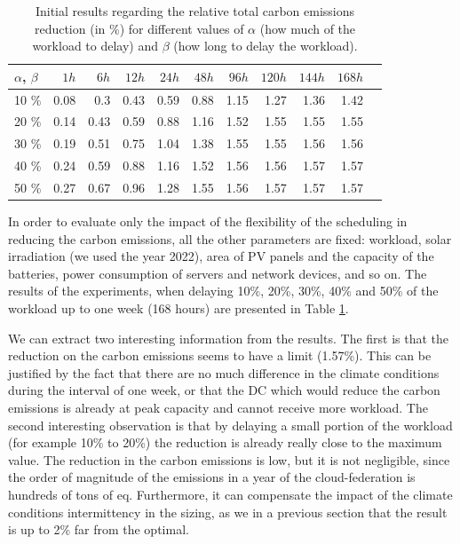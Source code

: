   \begin{table}[H]
    \caption{Initial results regarding the relative total carbon emissions reduction (in \%) for different values of $\alpha$ (how much of the workload to delay) and $\beta$ (how long to delay the workload).}\centering
    \label{tab:flex_scheduling}
    \begin{tabular}{|l|r|r|r|r|r|r|r|r|r|r|}
      \hline
      $\alpha$, $\beta$ &   \textbf{$ 1 h $} &   \textbf{$ 6 h $} &  \textbf{$ 12 h $} &  \textbf{$ 24 h $} &  \textbf{$ 48 h $} &  \textbf{$ 96 h$} &   \textbf{$ 120 h $} &   \textbf{$ 144 h$} &   \textbf{$ 168 h$}\\ 
      \hline
      10 \%   &  0.08 &  0.3 &  0.43 &  0.59 &  0.88 &  1.15 &  1.27 &  1.36 &  1.42 \\ 
      \hline
      20 \%   &  0.14 &  0.43 &  0.59 &  0.88 &  1.16 &  1.52 &  1.55 &  1.55 &  1.55 \\ 
      \hline
       30 \%   &  0.19 &  0.51 &  0.75 &  1.04 &  1.38 &  1.55 &  1.55 &  1.56 &  1.56 \\ 
      \hline
       40 \%  &  0.24 &  0.59 &  0.88 &  1.16 &  1.52 &  1.56 &  1.56 &  1.57 &  1.57 \\ 
      \hline
       50 \%   &  0.27 &  0.67 &  0.96 &  1.28 &  1.55 &  1.56 &  1.57 &  1.57 &  1.57 \\ 
      \hline
    \end{tabular}
  \end{table}

In order to evaluate only the impact of the flexibility of the scheduling in reducing the carbon emissions, all the other parameters are fixed: workload, solar irradiation (we used the year 2022), area of PV panels and the capacity of the batteries, power consumption of servers and network devices, and so on. The results of the experiments, when delaying 10\%, 20\%, 30\%, 40\% and 50\% of the workload up to one week (168 hours) are presented in Table \ref{tab:flex_scheduling}.

We can extract two interesting information from the results. The first is that the reduction on the carbon emissions seems to have a limit (1.57\%). This can be justified by the fact that there are no much difference in the climate conditions during the interval of one week, or that the DC which would reduce the carbon emissions is already at peak capacity and cannot receive more workload. The second interesting observation is that by delaying a small portion of the workload (for example 10\% to 20\%)  the reduction is already really close to the maximum value. The reduction in the carbon emissions is low, but it is not negligible, since the order of magnitude of the emissions in a year of the cloud-federation is hundreds of tons of  eq. Furthermore, it can compensate the impact of the climate conditions intermittency in the sizing, as we in a previous section that the result is up to 2\% far from the optimal.
